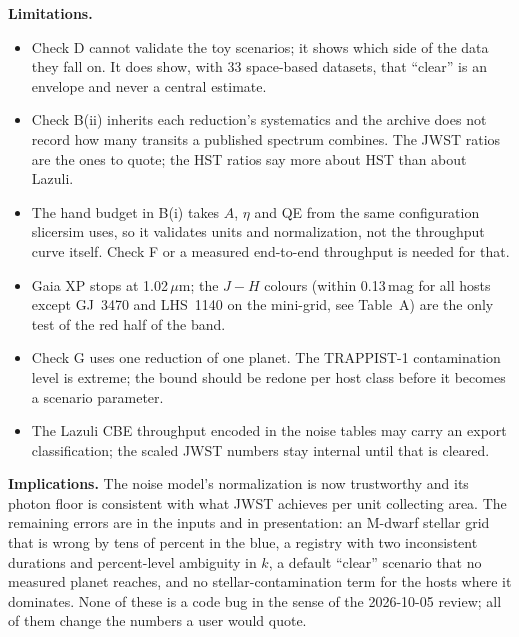 \documentclass[11pt]{article}
\begin{document}
\textbf{Limitations.}
\begin{itemize}[leftmargin=*,itemsep=1pt]
  \item Check D cannot validate the toy scenarios; it shows which side of the data they fall on. It does show, with 33 space-based datasets, that ``clear'' is an envelope and never a central estimate.
  \item Check B(ii) inherits each reduction's systematics and the archive does not record how many transits a published spectrum combines. The JWST ratios are the ones to quote; the HST ratios say more about HST than about Lazuli.
  \item The hand budget in B(i) takes $A$, $\eta$ and QE from the same configuration slicersim uses, so it validates units and normalization, not the throughput curve itself. Check F or a measured end-to-end throughput is needed for that.
  \item Gaia XP stops at 1.02\,$\mu$m; the $J{-}H$ colours (within 0.13\,mag for all hosts except GJ~3470 and LHS~1140 on the mini-grid, see Table~A) are the only test of the red half of the band.
  \item Check G uses one reduction of one planet. The TRAPPIST-1 contamination level is extreme; the bound should be redone per host class before it becomes a scenario parameter.
  \item The Lazuli CBE throughput encoded in the noise tables may carry an export classification; the scaled JWST numbers stay internal until that is cleared.
\end{itemize}

\textbf{Implications.} The noise model's normalization is now trustworthy and its photon floor is consistent with what JWST achieves per unit collecting area. The remaining errors are in the inputs and in presentation: an M-dwarf stellar grid that is wrong by tens of percent in the blue, a registry with two inconsistent durations and percent-level ambiguity in $k$, a default ``clear'' scenario that no measured planet reaches, and no stellar-contamination term for the hosts where it dominates. None of these is a code bug in the sense of the 2026-10-05 review; all of them change the numbers a user would quote.
\end{document}
